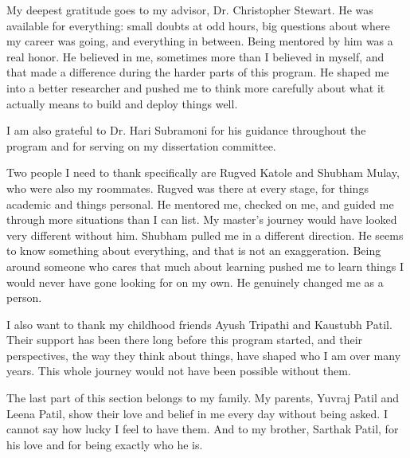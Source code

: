 \begin{acknowledgements}
My deepest gratitude goes to my advisor, Dr. Christopher Stewart. He was available for everything: small doubts at odd hours, big questions about where my career was going, and everything in between. Being mentored by him was a real honor. He believed in me, sometimes more than I believed in myself, and that made a difference during the harder parts of this program. He shaped me into a better researcher and pushed me to think more carefully about what it actually means to build and deploy things well.

I am also grateful to Dr. Hari Subramoni for his guidance throughout the program and for serving on my dissertation committee.

Two people I need to thank specifically are Rugved Katole and Shubham Mulay, who were also my roommates. Rugved was there at every stage, for things academic and things personal. He mentored me, checked on me, and guided me through more situations than I can list. My master's journey would have looked very different without him. Shubham pulled me in a different direction. He seems to know something about everything, and that is not an exaggeration. Being around someone who cares that much about learning pushed me to learn things I would never have gone looking for on my own. He genuinely changed me as a person.

I also want to thank my childhood friends Ayush Tripathi and Kaustubh Patil. Their support has been there long before this program started, and their perspectives, the way they think about things, have shaped who I am over many years. This whole journey would not have been possible without them.

The last part of this section belongs to my family. My parents, Yuvraj Patil and Leena Patil, show their love and belief in me every day without being asked. I cannot say how lucky I feel to have them. And to my brother, Sarthak Patil, for his love and for being exactly who he is.
\end{acknowledgements}

